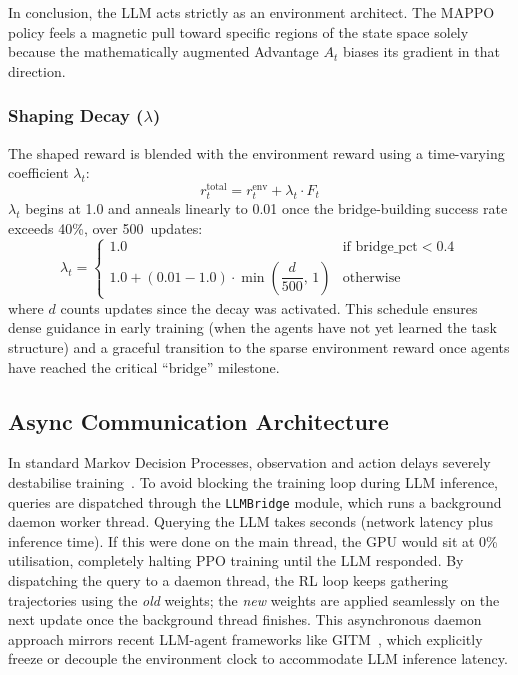 In conclusion, the LLM acts strictly as an environment architect. The MAPPO policy feels a magnetic pull toward specific regions of the state space solely because the mathematically augmented Advantage $A_t$ biases its gradient in that direction.



\subsubsection{Shaping Decay ($\lambda$)}
The shaped reward is blended with the environment reward using a
time-varying coefficient $\lambda_t$:
\begin{equation}
\label{eq:total_reward}
    r_t^{\text{total}}
    = r_t^{\text{env}}
    + \lambda_t \cdot F_t
\end{equation}
$\lambda_t$ begins at 1.0 and anneals linearly to 0.01 once the
bridge-building success rate exceeds 40\%, over 500~updates:
\begin{equation}
    \lambda_t =
    \begin{cases}
        1.0 & \text{if bridge\_pct} < 0.4 \\[4pt]
        1.0 + (0.01 - 1.0) \cdot \min\!\left(\dfrac{d}{500},\, 1\right)
        & \text{otherwise}
    \end{cases}
\end{equation}
where $d$ counts updates since the decay was activated.
This schedule ensures dense guidance in early training (when the agents
have not yet learned the task structure) and a graceful transition to
the sparse environment reward once agents have reached the critical
``bridge'' milestone.

\subsection{Async Communication Architecture}
\label{sec:async_bridge}

In standard Markov Decision Processes, observation and action delays severely destabilise training~\parencite{Katsikopoulos_Engelbrecht_2003}.
To avoid blocking the training loop during LLM inference, queries are
dispatched through the \texttt{LLMBridge} module, which runs a
background daemon worker thread.
Querying the LLM takes seconds (network latency plus inference time).
If this were done on the main thread, the GPU would sit at 0\%
utilisation, completely halting PPO training until the LLM responded.
By dispatching the query to a daemon thread, the RL loop keeps
gathering trajectories using the \emph{old} weights; the \emph{new}
weights are applied seamlessly on the next update once the background
thread finishes. This asynchronous daemon approach mirrors recent LLM-agent frameworks like GITM~\parencite{Zhu_etal_2023}, which explicitly freeze or decouple the environment clock to accommodate LLM inference latency.

